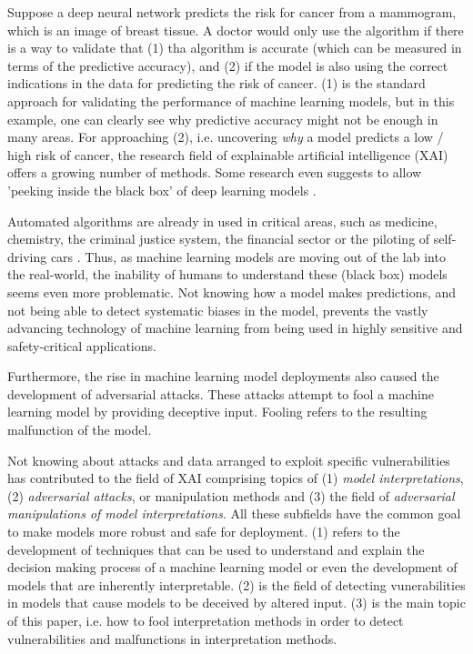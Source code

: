Suppose a deep neural network predicts the risk for cancer from a mammogram, which is an image of breast tissue. A doctor would only use the algorithm if there is a way to validate that (1) tha algorithm is accurate (which can be measured in terms of the predictive accuracy), and (2) if the model is also using the correct indications in the data for predicting the risk of cancer. (1) is the standard approach for validating the performance of machine learning models, but in this example, one can clearly see why predictive accuracy might not be enough in many areas. For approaching (2), i.e. uncovering \textit{why} a model predicts a low / high risk of cancer, the research field of explainable artificial intelligence (XAI) offers a growing number of methods. Some research even suggests to allow 'peeking inside the black box' of deep learning models \cite{adadi2018peeking}.  

Automated algorithms are already in used in critical areas, such as medicine, chemistry, the criminal justice system, the financial sector or the piloting of self-driving cars \cite{chouldechova2017fair, elshawi2019interpretability, whitmore2016mapping}. %
Thus, as machine learning models are moving out of the lab into the real-world, the inability of humans to understand these (black box) models seems even more problematic. Not knowing how a model makes predictions, and not being able to detect systematic biases in the model, prevents the vastly advancing technology of machine learning from being used in highly sensitive and safety-critical applications.  

Furthermore, the rise in machine learning model deployments also caused the development of adversarial attacks. These attacks attempt to fool a machine learning model by providing deceptive input. Fooling refers to the resulting malfunction of the model. 

Not knowing about attacks and data arranged to exploit specific vulnerabilities has contributed to the field of XAI comprising topics of (1) \textit{model interpretations}, (2) \textit{adversarial attacks}, or manipulation methods and (3) the field of \textit{adversarial manipulations of model interpretations}. All these subfields have the common goal to make models more robust and safe for deployment. 
(1) refers to the development of techniques that can be used to understand and explain the decision making process of a machine learning model or even the development of models that are inherently interpretable. (2) is the field of detecting vunerabilities in models that cause models to be deceived by altered input. 
(3) is the main topic of this paper, i.e. how to fool interpretation methods in order to detect vulnerabilities and malfunctions in interpretation methods. 

